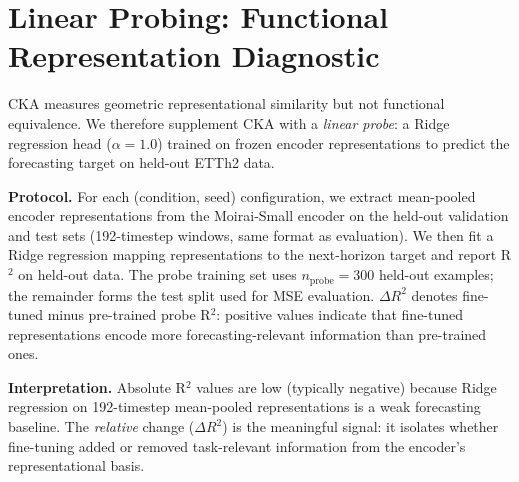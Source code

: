 
\section{Linear Probing: Functional Representation Diagnostic}
\label{app:probing}

\noindent{}
\vspace{1em}

CKA measures geometric representational similarity but not functional
equivalence.  We therefore supplement CKA with a \emph{linear probe}:
a Ridge regression head ($\alpha{=}1.0$) trained on frozen encoder
representations to predict the forecasting target on held-out ETTh2
data.

\textbf{Protocol.}
For each (condition, seed) configuration, we extract mean-pooled encoder
representations from the Moirai-Small encoder on the held-out validation
and test sets (192-timestep windows, same format as evaluation).
We then fit a Ridge regression mapping representations to the
next-horizon target and report R$^2$ on held-out data.
The probe training set uses $n_{\text{probe}}{=}300$ held-out examples;
the remainder forms the test split used for MSE evaluation.
$\Delta R^2$ denotes fine-tuned minus pre-trained probe R$^2$:
positive values indicate that fine-tuned representations encode
more forecasting-relevant information than pre-trained ones.

\textbf{Interpretation.}
Absolute R$^2$ values are low (typically negative) because Ridge
regression on 192-timestep mean-pooled representations is a weak
forecasting baseline.  The \emph{relative} change ($\Delta R^2$)
is the meaningful signal: it isolates whether fine-tuning added
or removed task-relevant information from the encoder's
representational basis.

